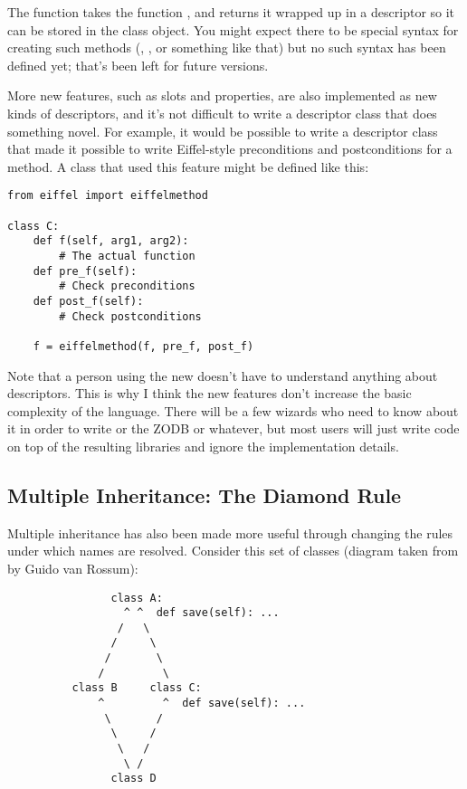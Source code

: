 \documentclass{howto}
\begin{document}
The  function takes the function
, and returns it wrapped up in a descriptor so it can be
stored in the class object.  You might expect there to be special
syntax for creating such methods (,
, or something like that) but no such syntax has
been defined yet; that's been left for future versions.

More new features, such as slots and properties, are also implemented
as new kinds of descriptors, and it's not difficult to write a
descriptor class that does something novel.  For example, it would be
possible to write a descriptor class that made it possible to write
Eiffel-style preconditions and postconditions for a method.  A class
that used this feature might be defined like this:

\begin{verbatim}
from eiffel import eiffelmethod

class C:
    def f(self, arg1, arg2):
        # The actual function
    def pre_f(self):
        # Check preconditions
    def post_f(self):
        # Check postconditions

    f = eiffelmethod(f, pre_f, post_f)
\end{verbatim}

Note that a person using the new  doesn't
have to understand anything about descriptors.  This is why I think
the new features don't increase the basic complexity of the language.
There will be a few wizards who need to know about it in order to
write  or the ZODB or whatever, but most
users will just write code on top of the resulting libraries and
ignore the implementation details.

\subsection{Multiple Inheritance: The Diamond Rule}

Multiple inheritance has also been made more useful through changing
the rules under which names are resolved.  Consider this set of classes
(diagram taken from  by Guido van Rossum):

\begin{verbatim}
                class A:
                  ^ ^  def save(self): ...
                 /   \
                /     \
               /       \
              /         \
          class B     class C:
              ^         ^  def save(self): ...
               \       /
                \     /
                 \   /
                  \ /
                class D
\end{verbatim}
\end{document}
